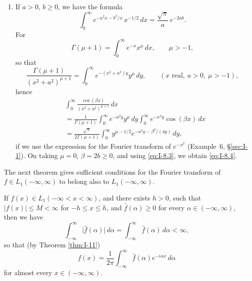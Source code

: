 \begin{enumerate}[label=\arabic*.,ref=\arabic*]
\item If $a>0$, $b\ge 0$, we have the formula
\begin{equation}\label{eq:I-8.4}\tag{8.4}
\int_{0}^{\infty}e^{-a^{2}x-b^{2}/x}\,x^{-1/2}\,dx=\frac{\sqrt{\pi}}{a}\,e^{-2ab}.
\end{equation}
For
\begin{equation*}
\Gamma(\mu+1)=\int_{0}^{\infty}e^{-x}x^{\mu}\,dx,\qquad\mu>-1,
\end{equation*}
so that
\begin{equation*}
\frac{\Gamma(\mu+1)}{(x^{2}+a^{2})^{\mu+1}}
=\int_{0}^{\infty}e^{-(x^{2}+a^{2})y}y^{\mu}\,dy,\qquad(x\text{ real},\ a>0,\ \mu>-1),
\end{equation*}
hence
\begin{equation*}
\begin{aligned}
& \int_{0}^{\infty}\frac{\cos(\beta x)}{(x^{2}+a^{2})^{\mu+1}}\,dx\\
&= \frac{1}{\Gamma(\mu+1)}  \int_{0}^{\infty}e^{-a^{2}y}y^{\mu}\,dy  \int_{0}^{\infty}e^{-x^{2}y}\cos(\beta x)\,dx\\
&= \frac{\sqrt{\pi}}{2\Gamma(\mu+1)}\int_{0}^{\infty}y^{\mu-1/2}e^{-a^{2}y-\beta^{2}/(4y)}\,dy,
\end{aligned}
\end{equation*}
if we use the expression for the Fourier transform of $e^{-x^{2}}$ (Example~6, \S\ref{sec:I-1}). On taking $\mu=0$, $\beta=2b\ge 0$, and using \eqref{eq:I-8.3}, we obtain \eqref{eq:I-8.4}.
\end{enumerate}

The next theorem gives sufficient conditions for the Fourier transform of $f\in L_1(-\infty,\infty)$ to belong also to $L_1(-\infty,\infty)$.

\begin{theorem}\label{thm:I-12}
If $f(x)\in L_1(-\infty<x<\infty)$, and there exists $h>0$, such that $|f(x)|\le M<\infty$ for $-h\le x\le h$, and $\widehat f(\alpha)\ge 0$ for every $\alpha\in(-\infty,\infty)$, then we have
\begin{equation*}
\int_{-\infty}^{\infty}\bigl|\widehat f(\alpha)\bigr|\,d\alpha
=\int_{-\infty}^{\infty}\widehat f(\alpha)\,d\alpha<\infty,
\end{equation*}
so that (by Theorem \ref{thm:I-11})
\begin{equation*}
f(x)=\frac{1}{2\pi}\int_{-\infty}^{\infty}\widehat f(\alpha)e^{-i\alpha x}\,d\alpha
\end{equation*}
for almost every $x\in(-\infty,\infty)$.
\end{theorem}

